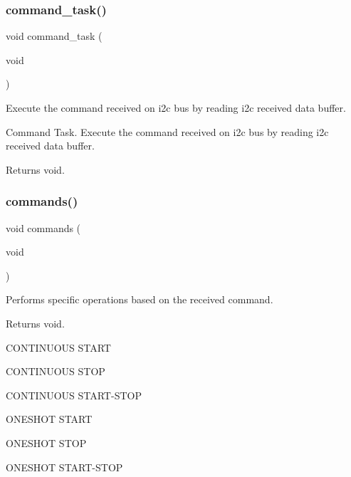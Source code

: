 \subsubsection{\texorpdfstring{command\+\_\+task()}{command\_task()}}
{\footnotesize\ttfamily void command\+\_\+task (\begin{DoxyParamCaption}\item[{void}]{ }\end{DoxyParamCaption})}



Execute the command received on i2c bus by reading i2c received data buffer. 

Command Task. Execute the command received on i2c bus by reading i2c received data buffer.

\begin{DoxyReturn}{Returns}
void. 
\end{DoxyReturn}
\mbox{\label{i2c-th_8h_aaad2f6556489c51f2c24302e2cb4188a}} 
\subsubsection{\texorpdfstring{commands()}{commands()}}
{\footnotesize\ttfamily void commands (\begin{DoxyParamCaption}\item[{void}]{ }\end{DoxyParamCaption})}



Performs specific operations based on the received command. 

\begin{DoxyReturn}{Returns}
void. 
\end{DoxyReturn}
C\+O\+N\+T\+I\+N\+U\+O\+US S\+T\+A\+RT

C\+O\+N\+T\+I\+N\+U\+O\+US S\+T\+OP

C\+O\+N\+T\+I\+N\+U\+O\+US S\+T\+A\+R\+T-\/\+S\+T\+OP

O\+N\+E\+S\+H\+OT S\+T\+A\+RT

O\+N\+E\+S\+H\+OT S\+T\+OP

O\+N\+E\+S\+H\+OT S\+T\+A\+R\+T-\/\+S\+T\+OP \mbox{\label{i2c-th_8h_aafa3d59a1bde3085849eee08f110612f}} 
